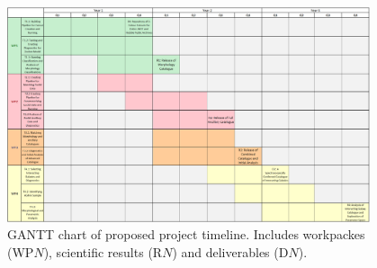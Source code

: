 \documentclass[11pt]{article}
\begin{document}
\begin{figure}
    \centering
    \includegraphics[width = 0.95\textwidth]{figures/draft-gantt-v2.png}
    \caption{GANTT chart of proposed project timeline. Includes workpackes (WP$N$), scientific results (R$N$) and deliverables (D$N$).}
    \label{fig:gantt-chart}
\end{figure}


\end{document}
